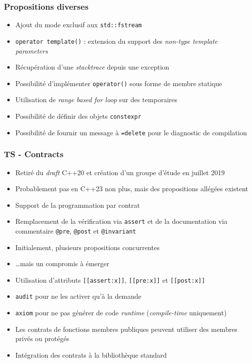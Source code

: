 \documentclass[C++.tex]{subfiles}
\begin{document}
\begin{frame}[fragile]
	\frametitle{Propositions diverses}
	\begin{itemize}
		\item Ajout du mode exclusif aux \lstinline|std::fstream|
		\item \lstinline|operator template()| : extension du support des \textit{non-type template parameters}
		\item Récupération d'une \textit{stacktrace} depuis une exception
		\item Possibilité d'implémenter \lstinline|operator()| sous forme de membre statique
		\item Utilisation de \textit{range based for loop} sur des temporaires
		\item Possibilité de définir des objets \lstinline|constexpr|
		\item Possibilité de fournir un message à \lstinline|=delete| pour le diagnostic de compilation
	\end{itemize}
\end{frame}
		
\begin{frame}[fragile]
	\frametitle{TS - Contracts}
	\begin{itemize}
		\item Retiré du \textit{draft} C++20 et création d'un groupe d'étude en juillet 2019
		\item Probablement pas en C++23 non plus, mais des propositions allégées existent


		\item Support de la programmation par contrat
		\item Remplacement de la vérification via \lstinline|assert| et de la documentation via commentaire \lstinline|@pre|, \lstinline|@post| et \lstinline|@invariant|
		\item Initialement, plusieurs propositions \og concurrentes\fg{}
		\item \ldots{}mais un compromis à émerger
		\item Utilisation d'attributs \lstinline|[[assert:x]]|, \lstinline|[[pre:x]]| et \lstinline|[[post:x]]|


		\item \lstinline|audit| pour ne les activer qu'à la demande
		\item \lstinline|axiom| pour ne pas générer de code \textit{runtime} (\textit{compile-time} uniquement)
		\item Les contrats de fonctions membres publiques peuvent utiliser des membres privés ou protégés
		\item Intégration des contrats à la bibliothèque standard
	\end{itemize}
\end{frame}
\end{document}
